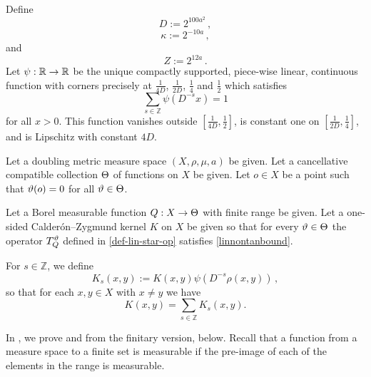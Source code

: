 Define
\begin{equation}\label{defineD}
    D:= 2^{100 a^2}\, ,
\end{equation}
\begin{equation}\label{definekappa}
    \kappa:= 2^{-10a}\,,
\end{equation}
and
\begin{equation}
    \label{defineZ}
    Z := 2^{12a}\,.
\end{equation}
Let
 $\psi:{\mathbb{R}} \to {\mathbb{R}}$ be the unique compactly supported, piece-wise linear, continuous function with corners precisely at $\frac 1{4D}$, $\frac 1{2D}$, $\frac 14$ and $\frac 12$ which satisfies
 \begin{equation}
    \label{eq-psisum}
    \sum_{s\in \mathbb{Z}} \psi(D^{-s}x)=1
\end{equation}
for all $x>0$. This function vanishes outside $[\frac1{4D},\frac 12]$, is constant one on
$[\frac1{2D},\frac 14]$, and is Lipschitz
with constant $4D$.




Let a doubling metric measure space $(X,\rho,\mu, a)$ be given.
Let a cancellative compatible collection ${\Theta}$ of functions on $X$ be given.
Let $o\in X$ be a point such that ${\vartheta}(o)=0$
for all ${\vartheta}\in {\Theta}$.


Let a Borel measurable function ${Q}:X\to {\Theta}$ with finite range be given.
Let a one-sided Calder\'on--Zygmund kernel $K$ on $X$ be given so that for every ${\vartheta}\in {\Theta}$ the operator $T_{{Q}}^{{\vartheta}}$ defined in \eqref{def-lin-star-op}
satisfies \eqref{linnontanbound}.



For $s\in\mathbb{Z}$, we define
\begin{equation}\label{defks}
    K_s(x,y):=K(x,y)\psi(D^{-s}\rho(x,y))\,,
\end{equation}
so that for each $x, y \in X$ with $x\neq y$ we have
$$K(x,y)=\sum_{s\in\mathbb{Z}}K_s(x,y).$$

In , we prove  and 
from the finitary version,  below. Recall
that a function from a measure space to a finite set is measurable if the pre-image of each of the elements in the range is measurable.


